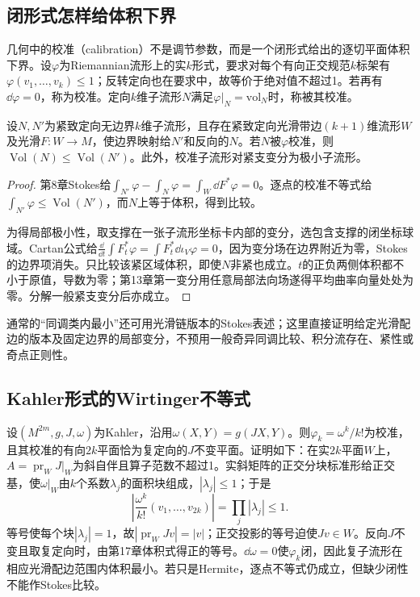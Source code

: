 \subsection{闭形式怎样给体积下界}
几何中的校准（calibration）不是调节参数，而是一个闭形式给出的逐切平面体积下界。设$\varphi$为Riemannian流形上的实$k$形式，要求对每个有向正交规范$k$标架有$\varphi(v_1,\ldots,v_k)\leq1$；反转定向也在要求中，故等价于绝对值不超过1。若再有$\dd\varphi=0$，称为校准。定向$k$维子流形$N$满足$\varphi|_N=\mathrm{vol}_N$时，称被其校准。

\begin{theorem}[校准的体积比较]\label{thm:calibration-minimizing}
设$N,N'$为紧致定向无边界$k$维子流形，且存在紧致定向光滑带边$(k+1)$维流形$W$及光滑$F:W\to M$，使边界映射给$N'$和反向的$N$。若$N$被$\varphi$校准，则$\operatorname{Vol}(N)\leq\operatorname{Vol}(N')$。此外，校准子流形对紧支变分为极小子流形。
\end{theorem}
\begin{proof}
第8章Stokes给$\int_{N'}\varphi-\int_N\varphi=\int_W\dd F^*\varphi=0$。逐点的校准不等式给$\int_{N'}\varphi\leq\operatorname{Vol}(N')$，而$N$上等于体积，得到比较。

为得局部极小性，取支撑在一张子流形坐标卡内部的变分，选包含支撑的闭坐标球域。Cartan公式给$\frac{\dd}{\dd t}\int F_t^*\varphi=\int F_t^*\dd\iota_V\varphi=0$，因为变分场在边界附近为零，Stokes的边界项消失。只比较该紧区域体积，即使$N$非紧也成立。$t$的正负两侧体积都不小于原值，导数为零；第13章第一变分用任意局部法向场遂得平均曲率向量处处为零。分解一般紧支变分后亦成立。
\end{proof}
通常的“同调类内最小”还可用光滑链版本的Stokes表述；这里直接证明给定光滑配边的版本及固定边界的局部变分，不预用一般奇异同调比较、积分流存在、紧性或奇点正则性。

\subsection{Kahler形式的Wirtinger不等式}
设$(M^{2m},g,J,\omega)$为Kahler，沿用$\omega(X,Y)=g(JX,Y)$。则$\varphi_k=\omega^k/k!$为校准，且其校准的有向$2k$平面恰为复定向的$J$不变平面。证明如下：在实$2k$平面$W$上，$A=\operatorname{pr}_WJ|_W$为斜自伴且算子范数不超过1。实斜矩阵的正交分块标准形给正交基，使$\omega|_W$由$k$个系数$\lambda_j$的面积块组成，$|\lambda_j|\leq1$；于是
\[
 \left|\frac{\omega^k}{k!}(v_1,\ldots,v_{2k})\right|
 =\prod_j|\lambda_j|\leq1.
\]
等号使每个块$|\lambda_j|=1$，故$|\operatorname{pr}_WJv|=|v|$；正交投影的等号迫使$Jv\in W$。反向$J$不变且取复定向时，由第17章体积式得正的等号。$\dd\omega=0$使$\varphi_k$闭，因此复子流形在相应光滑配边范围内体积最小。若只是Hermite，逐点不等式仍成立，但缺少闭性不能作Stokes比较。

